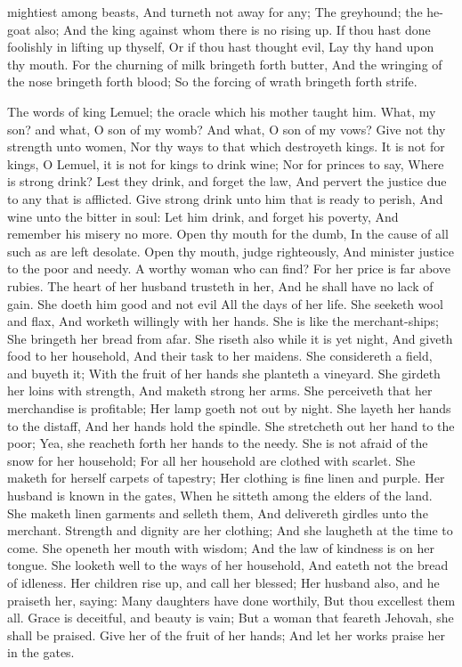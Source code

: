 mightiest among beasts, And turneth not away for any;  The greyhound; the he-goat also; And the king against whom there is no rising up.  If thou hast done foolishly in lifting up thyself, Or if thou hast thought evil, Lay thy hand upon thy mouth.  For the churning of milk bringeth forth butter, And the wringing of the nose bringeth forth blood; So the forcing of wrath bringeth forth strife. 

The words of king Lemuel; the oracle which his mother taught him.  What, my son? and what, O son of my womb? And what, O son of my vows?  Give not thy strength unto women, Nor thy ways to that which destroyeth kings.  It is not for kings, O Lemuel, it is not for kings to drink wine; Nor for princes to say, Where is strong drink?  Lest they drink, and forget the law, And pervert the justice due to any that is afflicted.  Give strong drink unto him that is ready to perish, And wine unto the bitter in soul:  Let him drink, and forget his poverty, And remember his misery no more.  Open thy mouth for the dumb, In the cause of all such as are left desolate.  Open thy mouth, judge righteously, And minister justice to the poor and needy.  A worthy woman who can find? For her price is far above rubies.  The heart of her husband trusteth in her, And he shall have no lack of gain.  She doeth him good and not evil All the days of her life.  She seeketh wool and flax, And worketh willingly with her hands.  She is like the merchant-ships; She bringeth her bread from afar.  She riseth also while it is yet night, And giveth food to her household, And their task to her maidens.  She considereth a field, and buyeth it; With the fruit of her hands she planteth a vineyard.  She girdeth her loins with strength, And maketh strong her arms.  She perceiveth that her merchandise is profitable; Her lamp goeth not out by night.  She layeth her hands to the distaff, And her hands hold the spindle.  She stretcheth out her hand to the poor; Yea, she reacheth forth her hands to the needy.  She is not afraid of the snow for her household; For all her household are clothed with scarlet.  She maketh for herself carpets of tapestry; Her clothing is fine linen and purple.  Her husband is known in the gates, When he sitteth among the elders of the land.  She maketh linen garments and selleth them, And delivereth girdles unto the merchant.  Strength and dignity are her clothing; And she laugheth at the time to come.  She openeth her mouth with wisdom; And the law of kindness is on her tongue.  She looketh well to the ways of her household, And eateth not the bread of idleness.  Her children rise up, and call her blessed; Her husband also, and he praiseth her, saying:  Many daughters have done worthily, But thou excellest them all.  Grace is deceitful, and beauty is vain; But a woman that feareth Jehovah, she shall be praised.  Give her of the fruit of her hands; And let her works praise her in the gates. 